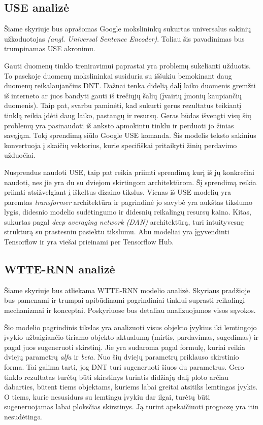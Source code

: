 \documentclass{VUMIFPSkursinis}
\begin{document}
\subsection{USE analizė}

Šiame skyriuje bus aprašomas Google mokslininkų sukurtas universalus sakinių užkoduotojas \textit{(angl. Universal Sentence Encoder)}. Toliau šis pavadinimas bus trumpinamas USE akronimu.  

Gauti duomenų tinklo treniravimui paprastai yra problemų sukelianti užduotis. To pasekoje duomenų mokslininkai susiduria su iššukiu bemokinant daug duomenų reikalaujančius DNT. Dažnai tenka didelią dalį laiko duomenis gremžti iš interneto ar juos bandyti gauti iš trečiųjų šalių (įvairių įmonių kaupiančių duomenis). Taip pat, svarbu paminėti, kad sukurti gerus rezultatus teikiantį tinklą reikia įdėti daug laiko, pastangų ir resursų. Geras būdas išvengti visų šių problemų yra pasinaudoti iš anksto apmokintu tinklu ir perduoti jo žinias savąjąm. Tokį sprendimą siūlo Google USE komanda. Šis modelis teksto sakinius konvertuoja į skaičių vektorius, kurie specifiškai pritaikyti žinių perdavimo užduočiai. 

Nusprendus naudoti USE, taip pat reikia priimti sprendimą kurį iš jų konkrečiai naudoti, nes jie yra du su dviejom skirtingom architektūrom. Šį sprendimą reikia priimti atsižvelgiant į iškeltus dizaino tikslus. Vienas iš USE modelių yra paremtas \textit{transformer} architektūra ir pagrindinė jo savybė yra aukštas tikslumo lygis, didesnio modelio sudėtingumo ir didesnių reikalingų resursų kaina. Kitas, sukurtas pagal \textit{deep averaging network (DAN)} architektūrą, turi intuityvesnę struktūrą su prastesniu pasiektu tikslumu. Abu modeliai yra įgyvendinti Tensorflow ir yra viešai prieinami per Tensorflow Hub.

\subsection{WTTE-RNN analizė}

Šiame skyriuje bus atliekama WTTE-RNN modelio analizė. Skyriaus pradžioje bus pamenami ir trumpai apibūdinami pagrindiniai tinklui suprasti reikalingi mechanizmai ir konceptai. Poskyriuose bus detaliau analizuojamos visos sąvokos. 

Šio modelio pagrindinis tikslas yra analizuoti visus objekto įvykius iki lemtingojo įvykio užbaigiančio tiriamo objekto aktualumą (mirtis, pardavimas, sugedimas) ir pagal juos sugeneruoti skirstinį. Jie yra sudaroma pagal formulę, kuriai reikia dviejų parametrų \textit{alfa} ir \textit{beta}. Nuo šių dviejų parametrų priklauso skirstinio forma. Tai galima tarti, jog DNT turi sugeneruoti šiuos du parametrus. Gero tinklo rezultatas turėtų būti skirstinys turintis didžiają dalį ploto arčiau dabarties, būtent tiems objektams, kuriems labai greitai atsitiks lemtingas įvykis. O tiems, kurie nesusidurs su lemtingu įvykiu dar ilgai, turėtų būti sugeneruojamas labai ploksčias skirstinys. Ją turint apskaičiuoti prognozę yra itin nesudėtinga.
\end{document}
